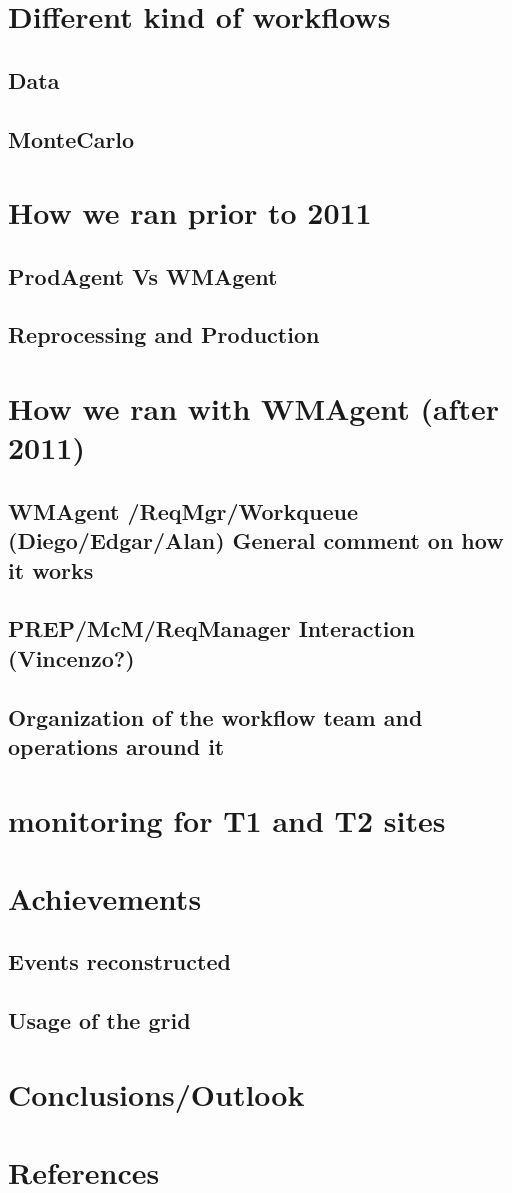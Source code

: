\documentclass[journal, transmag]{IEEEtran}
\begin{document}
\section{Different kind of workflows}

\subsection{Data}
\subsection{MonteCarlo}

\section{How we ran prior to 2011}
\subsection{ProdAgent Vs WMAgent}
\subsection{Reprocessing and Production}

\section{How we ran with WMAgent (after 2011)}
\subsection{WMAgent /ReqMgr/Workqueue (Diego/Edgar/Alan) General comment on how it works}
\subsection{PREP/McM/ReqManager Interaction (Vincenzo?)}
\subsection{Organization of the workflow team and operations around it }

\section{monitoring for T1 and T2 sites}
\section{Achievements}
\subsection{Events reconstructed}
\subsection{Usage of the grid}
\section{Conclusions/Outlook}
\section*{References}

\end{document}
